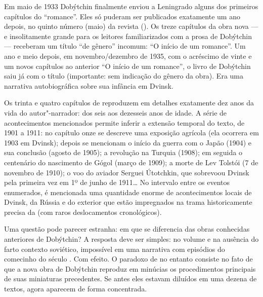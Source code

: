 \begin{multicols}{2}
Em maio de 1933 Dobýtchin finalmente enviou a Leningrado alguns dos
primeiros capítulos do ``romance''. Eles só puderam ser publicados
exatamente um ano depois, no quinto número (maio) da revista {} ({}). Os treze capítulos da obra nova
--- e insolitamente grande para os leitores familiarizados com a prosa
de Dobýtchin --- receberam um título ``de gênero'' incomum: ``O início
de um romance''. Um ano e meio depois, em novembro/dezembro de 1935, com
o acréscimo de vinte e um novos capítulos ao anterior ``O início de um
romance'', o livro de Dobýtchin saiu já com o título {}
(importante: sem indicação do gênero da obra). Era uma narrativa
autobiográfica sobre sua infância em Dvinsk.

Os trinta e quatro capítulos de {} reproduzem em
detalhes exatamente dez anos da vida do autor"-narrador: dos seis aos
dezesseis anos de idade. A série de acontecimentos mencionados permite
inferir a extensão temporal do texto, de 1901 a 1911: no capítulo onze
se descreve uma exposição agrícola (ela ocorrera em 1903 em Dvinsk);
depois se mencionam o início da guerra com o Japão (1904) e sua
conclusão (agosto de 1905); a revolução 
na Turquia (1908); em 
seguida o
centenário do nascimento de Gógol (março de 1909); a morte de Lev
Tolstói (7 de novembro de 1910); o voo do aviador Serguei Útotchkin, que
sobrevoou Dvinsk pela primeira vez em 1º de junho de 1911\ldots{} No
intervalo entre os eventos enumerados, é mencionada uma quantidade
enorme de acontecimentos locais de Dvinsk, da Rússia e do exterior que
estão impregnados na trama historicamente precisa da {}
(com raros deslocamentos cronológicos).

Uma questão pode parecer estranha: em que {} se
diferencia das obras conhecidas anteriores de Dobýtchin? A resposta deve
ser simples: no volume e na ausência do farto contexto soviético,
impossível em uma narrativa com episódios do comecinho do século . Com
efeito. O paradoxo de {} no entanto consiste no fato de
que a nova obra de Dobýtchin reproduz em minúcias os procedimentos
principais de suas miniaturas precedentes. Se antes eles estavam
diluídos em uma dezena de textos, agora aparecem de forma concentrada.

\vspace{\baselineskip}

{\small{}}


\end{multicols}

